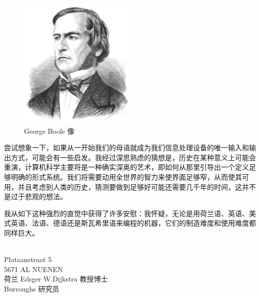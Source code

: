\documentclass[a4paper,12pt]{article}
\begin{document}
\begin{figure}[ht]
    \centering
    \includegraphics[height=2.5in]{images/George_Boole.jpeg}
    \caption{George Boole 像}
\end{figure}

尝试想象一下，如果从一开始我们的母语就成为我们信息处理设备的唯一输入和输出方式，可能会有一些启发。我经过深思熟虑的猜想是，历史在某种意义上可能会重演，计算机科学主要将是一种确实深奥的艺术，即如何从那里引导出一个定义足够明确的形式系统。我们将需要动用全世界的智力来使界面足够窄，从而使其可用，并且考虑到人类的历史，猜测要做到足够好可能还需要几千年的时间，这并不是过于悲观的想法。

我从如下这种强烈的直觉中获得了许多安慰：我怀疑，无论是用荷兰语、英语、美式英语、法语、德语还是斯瓦希里语来编程的机器，它们的制造难度和使用难度都同样巨大。

　\\Plataanstraat 5\\
5671 AL NUENEN\\
荷兰 Edsger W.Dijkstra 教授博士\\
Burroughs 研究员\\
\end{document}
